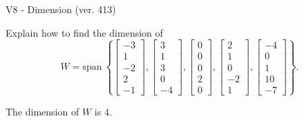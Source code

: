 \begin{exercise}
  \begin{exerciseTitle}V8 - Dimension (ver. 413)\end{exerciseTitle}
  \begin{exerciseStatement}
    Explain how to find the dimension of 
\[W=\mathrm{span}\ \left\{\left[\begin{array}{r}
-3 \\
1 \\
-2 \\
2 \\
-1
\end{array}\right] , \left[\begin{array}{r}
3 \\
1 \\
3 \\
0 \\
-4
\end{array}\right] , \left[\begin{array}{r}
0 \\
0 \\
0 \\
2 \\
0
\end{array}\right] , \left[\begin{array}{r}
2 \\
1 \\
0 \\
-2 \\
1
\end{array}\right] , \left[\begin{array}{r}
-4 \\
0 \\
1 \\
10 \\
-7
\end{array}\right]\right\}.\]



  \end{exerciseStatement}
  \begin{exerciseAnswer}
   The dimension of \(W\) is  \(4\).
  


  \end{exerciseAnswer}
\end{exercise}